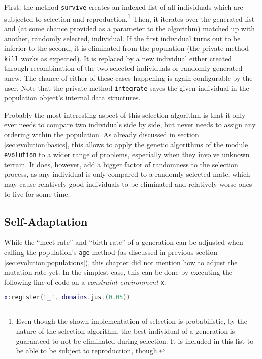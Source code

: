 First, the method \texttt{survive} creates an indexed list of all individuals which are subjected to selection and reproduction.\footnote{Even though the shown implementation of selection is probabilistic, by the nature of the selection algorithm, the best individual of a generation is guaranteed to not be eliminated during selection. It is included in this list to be able to be subject to reproduction, though.} Then, it iterates over the generated list and (at some chance provided as a parameter to the algorithm) matched up with another, randomly selected, individual. If the first individual turns out to be inferior to the second, it is eliminated from the population (the private method \texttt{kill} works as expected). It is replaced by a new individual either created through recombination of the two selected individuals or randomly generated anew. The chance of either of these cases happening is again configurable by the user. Note that the private method \texttt{integrate} saves the given individual in the population object's internal data structures.

Probably the most interesting aspect of this selection algorithm is that it only ever needs to compare two individuals side by side, but never needs to assign any ordering within the population. As already discussed in section \ref{sec:evolution:basics}, this allows to apply the genetic algorithms of the module \texttt{evolution} to a wider range of problems, especially when they involve unknown terrain. It does, however, add a bigger factor of randomness to the selection process, as any individual is only compared to a randomly selected mate, which may cause relatively good individuals to be eliminated and relatively worse ones to live for some time.

\subsection{Self-Adaptation}
\label{sec:evolution:adaptation}

While the ``meet rate'' and ``birth rate'' of a generation can be adjusted when calling the population's \texttt{age} method (as discussed in previous section \ref{sec:evolution:populations}), this chapter did not mention how to adjust the mutation rate yet. In the simplest case, this can be done by executing the following line of code on a \emph{constraint environment} \texttt{x}:

\begin{lstlisting}[language=lua, caption={Setting the mutation rate to 0.05}, label=lst:justmutationrate, name=lst:justmutationrate]
x:register("_", domains.just(0.05))
\end{lstlisting}

